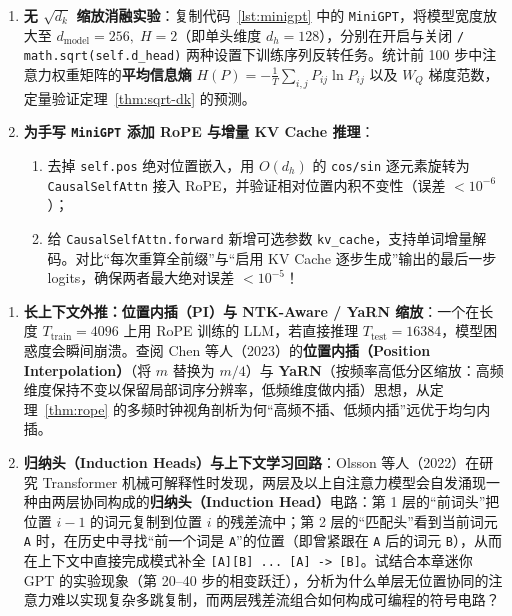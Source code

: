 \begin{enumerate}
  \item[\textbf{5.4.5}] \textbf{无 $\sqrt{d_k}$ 缩放消融实验}：复制代码~\ref{lst:minigpt} 中的 \texttt{MiniGPT}，将模型宽度放大至 $d_{\text{model}} = 256,\; H = 2$（即单头维度 $d_h = 128$），分别在开启与关闭 \texttt{/ math.sqrt(self.d\_head)} 两种设置下训练序列反转任务。统计前 100 步中注意力权重矩阵的\textbf{平均信息熵} $H(P) = -\frac{1}{T}\sum_{i,j} P_{ij}\ln P_{ij}$ 以及 $W_Q$ 梯度范数，定量验证定理~\ref{thm:sqrt-dk} 的预测。

  \item[\textbf{5.4.6}] \textbf{为手写 \texttt{MiniGPT} 添加 RoPE 与增量 KV Cache 推理}：
  \begin{enumerate}
    \item 去掉 \texttt{self.pos} 绝对位置嵌入，用 $O(d_h)$ 的 \texttt{cos/sin} 逐元素旋转为 \texttt{CausalSelfAttn} 接入 RoPE，并验证相对位置内积不变性（误差 $< 10^{-6}$）；
    \item 给 \texttt{CausalSelfAttn.forward} 新增可选参数 \texttt{kv\_cache}，支持单词增量解码。对比“每次重算全前缀”与“启用 KV Cache 逐步生成”输出的最后一步 logits，确保两者最大绝对误差 $< 10^{-5}$！
  \end{enumerate}
\end{enumerate}


\begin{enumerate}
  \item[\textbf{5.4.7}] \textbf{长上下文外推：位置内插（PI）与 NTK-Aware / YaRN 缩放}：一个在长度 $T_{\text{train}} = 4096$ 上用 RoPE 训练的 LLM，若直接推理 $T_{\text{test}} = 16384$，模型困惑度会瞬间崩溃。查阅 Chen 等人（2023）的\textbf{位置内插（Position Interpolation）}（将 $m$ 替换为 $m / 4$）与 \textbf{YaRN}（按频率高低分区缩放：高频维度保持不变以保留局部词序分辨率，低频维度做内插）思想，从定理~\ref{thm:rope} 的多频时钟视角剖析为何“高频不插、低频内插”远优于均匀内插。

  \item[\textbf{5.4.8}] \textbf{归纳头（Induction Heads）与上下文学习回路}：Olsson 等人（2022）在研究 Transformer 机械可解释性时发现，两层及以上自注意力模型会自发涌现一种由两层协同构成的\textbf{归纳头（Induction Head）}电路：第 1 层的“前词头”把位置 $i-1$ 的词元复制到位置 $i$ 的残差流中；第 2 层的“匹配头”看到当前词元 \texttt{A} 时，在历史中寻找“前一个词是 \texttt{A}”的位置（即曾紧跟在 \texttt{A} 后的词元 \texttt{B}），从而在上下文中直接完成模式补全 \texttt{[A][B] ... [A] -> [B]}。试结合本章迷你 GPT 的实验现象（第 20--40 步的相变跃迁），分析为什么单层无位置协同的注意力难以实现复杂多跳复制，而两层残差流组合如何构成可编程的符号电路？
\end{enumerate}
